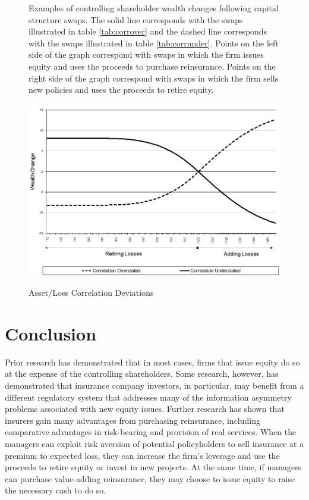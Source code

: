 \begin{figure}\caption{Asset/Loss Correlation Deviations\label{fig:corr}}
\begin{small}Examples of controlling shareholder wealth changes following capital structure swaps.  The solid line corresponds with the swaps illustrated in table \ref{tab:corrover} and the dashed line corresponds with the swaps illustrated in table \ref{tab:corrunder}.  Points on the left side of the graph correspond with swaps in which the firm issues equity and uses the proceeds to purchase reinsurance.  Points on the right side of the graph correspond with swaps in which the firm sells new policies and uses the proceeds to retire equity.\end{small}
\begin{center}
{\includegraphics[type=png,ext=.png,read=.png,width=4.8in]{corr}}
\end{center}
\end{figure}

\section{Conclusion}\label{sec:conclusion}

Prior research has demonstrated that in most cases, firms that issue equity do so at the expense of the controlling shareholders.  Some research, however, has demonstrated that insurance company investors, in particular, may benefit from a different regulatory system that addresses many of the information asymmetry problems associated with new equity issues.  Further research has shown that insurers gain many advantages from purchasing reinsurance, including comparative advantages in risk-bearing and provision of real services.  When the managers can exploit risk aversion of potential policyholders to sell insurance at a premium to expected loss, they can increase the firm's leverage and use the proceeds to retire equity or invest in new projects.  At the same time, if managers can purchase value-adding reinsurance, they may choose to issue equity to raise the necessary cash to do so.

